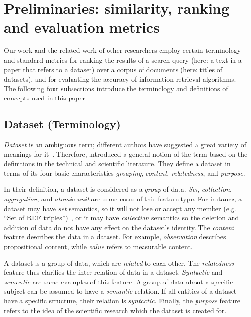 \documentclass{IOS-Book-Article}
\begin{document}
\section{Preliminaries: similarity, ranking and evaluation metrics}
\label{sec:preliminaries}
Our work and the related work of other researchers employ certain terminology and standard metrics for ranking the results of a search query (here: a text in a paper that refers to a dataset) over a corpus of documents (here: titles of datasets), and for evaluating the accuracy of information retrieval algorithms.
The following four subsections introduce the terminology and definitions of concepts used in this paper.

\subsection{Dataset (Terminology)} 
\emph{Dataset} is an ambiguous term; different authors have suggested a great variety of meanings for it~\cite{peplerpreservation}.
Therefore, \citeauthor{renear2010definitions} introduced a general notion of the term based on the definitions in the technical and scientific literature.
They define a dataset in terms of its four basic characteristics \emph{grouping}, \emph{content}, \emph{relatedness}, and \emph{purpose}.

In their definition, a dataset is considered as a \emph{group} of data.  \emph{Set}, \emph{collection}, \emph{aggregation}, and \emph{atomic unit} are some cases of this feature type.
For instance, a dataset may have \emph{set} semantics, so it will not lose or accept any member (e.g. “Set of RDF triples”)~\cite{renear2010definitions}, or it may have \emph{collection} semantics so the deletion and addition of data do not have any effect on the dataset's identity.
The \emph{content} feature describes the data in a dataset.
For example, \emph{observation} describes propositional content, while \emph{value} refers to measurable content.

A dataset is a group of data, which are \emph{related} to each other.
The \emph{relatedness} feature thus clarifies the inter-relation of data in a dataset.
\emph{Syntactic} and \emph{semantic} are some examples of this feature.   
A group of data about a specific subject can be assumed to have a \emph{semantic} relation.
If all entities of a dataset have a specific structure, their relation is \emph{syntactic}.
Finally, the \emph{purpose} feature refers to the idea of the scientific research which the dataset is created for.
\end{document}
